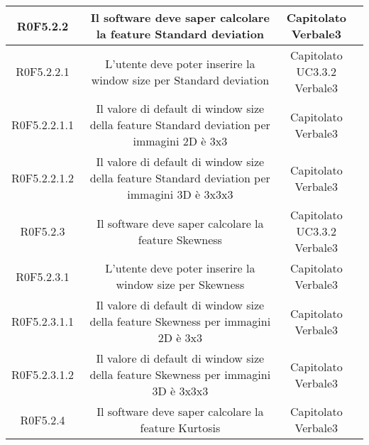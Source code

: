 \begin{center}
\begin{longtable}{|c|c|c|c|}
\hline
R0F5.2.2   & \parbox[t]{\larghezza}{Il software deve saper calcolare la feature\glossario{} Standard deviation}  & \parbox[t]{\dimFonti}{ Capitolato \\ Verbale3 \\} \\
\hline
R0F5.2.2.1   & \parbox[t]{\larghezza}{L'utente deve poter inserire la window size per Standard deviation}  & \parbox[t]{\dimFonti}{ Capitolato \\ UC3.3.2 \\ Verbale3 \\} \\
\hline
R0F5.2.2.1.1   & \parbox[t]{\larghezza}{Il valore di default di window size della feature\glossario{} Standard deviation per immagini 2D è 3x3 }  & \parbox[t]{\dimFonti}{ Capitolato \\ Verbale3 \\} \\
\hline
R0F5.2.2.1.2   & \parbox[t]{\larghezza}{Il valore di default di window size della feature\glossario{} Standard deviation per immagini 3D è 3x3x3 }  & \parbox[t]{\dimFonti}{ Capitolato \\ Verbale3 \\} \\
\hline
R0F5.2.3   & \parbox[t]{\larghezza}{Il software deve saper calcolare la feature\glossario{} Skewness}  & \parbox[t]{\dimFonti}{ Capitolato \\ UC3.3.2 \\ Verbale3 \\} \\
\hline
R0F5.2.3.1   & \parbox[t]{\larghezza}{L'utente deve poter inserire la window size per Skewness}  & \parbox[t]{\dimFonti}{ Capitolato \\ Verbale3 \\} \\
\hline
R0F5.2.3.1.1   & \parbox[t]{\larghezza}{Il valore di default di window size della feature\glossario{} Skewness per immagini 2D è 3x3 }  & \parbox[t]{\dimFonti}{ Capitolato \\ Verbale3 \\} \\
\hline
R0F5.2.3.1.2   & \parbox[t]{\larghezza}{Il valore di default di window size della feature\glossario{} Skewness per immagini 3D è 3x3x3 }  & \parbox[t]{\dimFonti}{ Capitolato \\ Verbale3 \\} \\
\hline
R0F5.2.4   & \parbox[t]{\larghezza}{Il software deve saper calcolare la feature\glossario{} Kurtosis}  & \parbox[t]{\dimFonti}{ Capitolato \\ Verbale3 \\} \\

\end{longtable}
\end{center}
